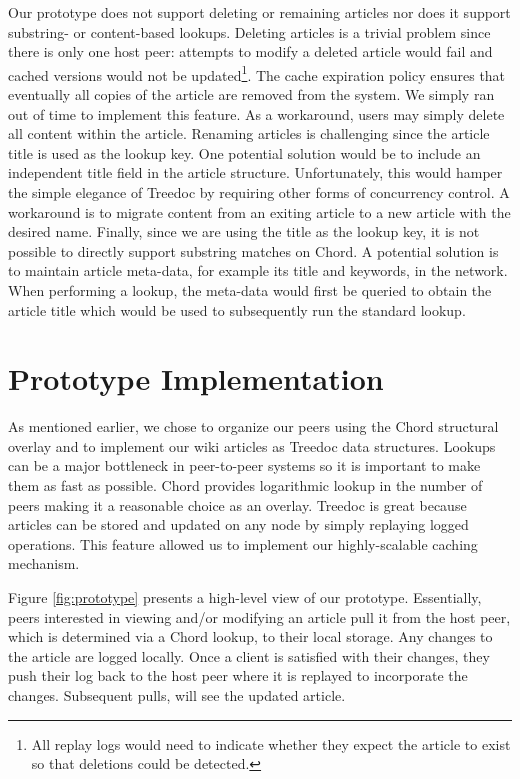 \documentclass[twocolumn]{article}
\begin{document}
Our prototype does not support deleting or remaining articles nor does it support substring- or content-based lookups. Deleting articles is a trivial problem since there is only one host peer: attempts to modify a deleted article would fail and cached versions would not be updated\footnote{All replay logs would need to indicate whether they expect the article to exist so that deletions could be detected.}. The cache expiration policy ensures that eventually all copies of the article are removed from the system. We simply ran out of time to implement this feature. As a workaround, users may simply delete all content within the article. Renaming articles is challenging since the article title is used as the lookup key. One potential solution would be to include an independent title field in the article structure. Unfortunately, this would hamper the simple elegance of Treedoc by requiring other forms of concurrency control. A workaround is to migrate content from an exiting article to a new article with the desired name. Finally, since we are using the title as the lookup key, it is not possible to directly support substring matches on Chord. A potential solution is to maintain article meta-data, for example its title and keywords, in the network. When performing a lookup, the meta-data would first be queried to obtain the article title which would be used to subsequently run the standard lookup.

\section{Prototype Implementation}
As mentioned earlier, we chose to organize our peers using the Chord structural overlay and to implement our wiki articles as Treedoc data structures. Lookups can be a major bottleneck in peer-to-peer systems so it is important to make them as fast as possible. Chord provides logarithmic lookup in the number of peers making it a reasonable choice as an overlay. Treedoc is great because articles can be stored and updated on any node by simply replaying logged operations. This feature allowed us to implement our highly-scalable caching mechanism.

Figure \ref{fig:prototype} presents a high-level view of our prototype. Essentially, peers interested in viewing and/or modifying an article pull it from the host peer, which is determined via a Chord lookup, to their local storage. Any changes to the article are logged locally. Once a client is satisfied with their changes, they push their log back to the host peer where it is replayed to incorporate the changes. Subsequent pulls, will see the updated article.
\end{document}
